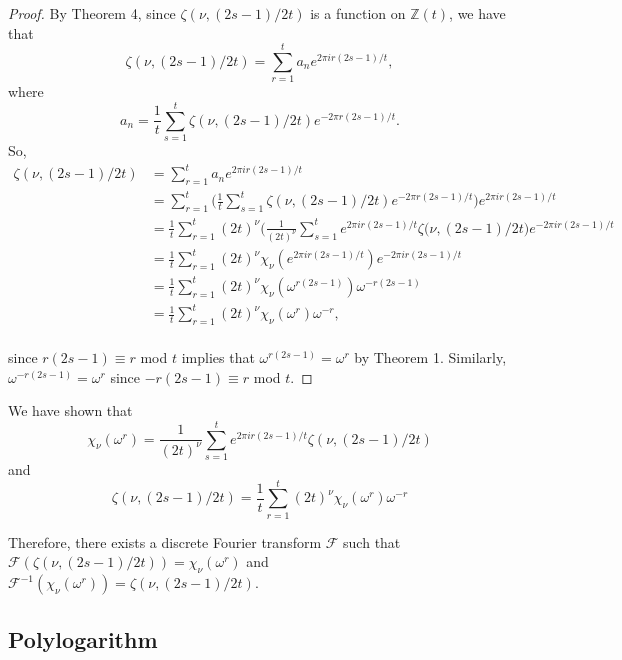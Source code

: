 \documentclass[../article.tex]{subfiles}
\begin{document}
\begin{proof}
By Theorem 4, since $\zeta(\nu, (2s-1)/2t)$ is a function on $\mathbb{Z}(t)$, we have that
\begin{equation}
\zeta(\nu, (2s-1)/2t) = \sum_{r=1}^{t} a_{n} e^{2 \pi i r(2s-1)/t},
\end{equation}
where
\begin{equation}
a_n = \frac{1}{t} \sum_{s=1}^{t} \zeta(\nu, (2s-1)/2t) e^{-2 \pi r(2s-1)/t}.
\end{equation}
So,
\begin{equation}
\begin{split}
\zeta(\nu, (2s-1)/2t) &= \sum_{r=1}^{t} a_{n} e^{2 \pi i r(2s-1)/t} \\
&= \sum_{r=1}^{t} \Bigg(\frac{1}{t} \sum_{s=1}^{t} \zeta(\nu, (2s-1)/2t) e^{-2 \pi r(2s-1)/t}\Bigg)e^{2 \pi i r(2s-1)/t} \\
&= \frac{1}{t} \sum_{r=1}^{t} (2t)^{\nu} \Bigg(\frac{1}{(2t)^{\nu}} \sum_{s=1}^{t} e^{2 \pi ir(2s-1)/t} \zeta(\nu, (2s-1)/2t \Bigg) e^{-2 \pi ir(2s-1)/t} \\
&= \frac{1}{t} \sum_{r=1}^{t} (2t)^{\nu} \chi_{\nu}(e^{2 \pi ir(2s-1)/t})e^{-2 \pi ir(2s-1)/t} \\
&= \frac{1}{t} \sum_{r=1}^{t} (2t)^{\nu} \chi_{\nu}(\omega^{r(2s-1)})\omega^{-r(2s-1)} \\
&= \frac{1}{t} \sum_{r=1}^{t} (2t)^{\nu} \chi_{\nu}(\omega^{r})\omega^{-r}, \\
\end{split}
\end{equation}

since $r(2s-1) \equiv r$ mod $t$ implies that $\omega^{r(2s-1)} = \omega^{r}$ by Theorem 1. Similarly, $\omega^{-r(2s-1)} = \omega^{r}$ since $-r(2s-1) \equiv r$ mod $t$.
\end{proof}

We have shown that
\begin{equation}
\chi_{\nu}(\omega^r) = \frac{1}{(2t)^{\nu}} \sum_{s=1}^{t} e^{2 \pi ir(2s-1)/t} \zeta(\nu, (2s-1)/2t)
\end{equation}
and
\begin{equation}
\zeta(\nu, (2s-1)/2t) = \frac{1}{t} \sum_{r=1}^{t} (2t)^{\nu} \chi_{\nu}(\omega^{r})\omega^{-r}
\end{equation}

Therefore, there exists a discrete Fourier transform $\mathcal{F}$ such that $\mathcal{F}(\zeta(\nu, (2s-1)/2t)) = \chi_{\nu}(\omega^r)$ and $\mathcal{F}^{-1}(\chi_{\nu}(\omega^r)) = \zeta(\nu, (2s-1)/2t)$.

\subsection{Polylogarithm}
\end{document}
